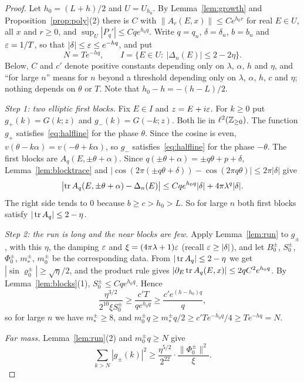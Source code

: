 \begin{proof}
Let $h_0=(L+h)/2$ and $U=U_{h_0}$. By Lemma~\ref{lem:growth} and Proposition~\ref{prop:poly}(2) there is $C$ with $\|A_r(E,x)\|\le Ce^{h_0r}$ for real $E\in U$, all $x$ and $r\ge0$, and $\sup_U|P_q'|\le Cqe^{h_0q}$. Write $q=q_n$, $\delta=\delta_n$, $b=b_n$ and $\varepsilon=1/T$, so that $|\delta|\le\varepsilon\le e^{-hq}$, and put
\[
N=Te^{-hq},\qquad I=\{E\in U:\ |\Delta_n(E)|\le2-2\eta\}.
\]
Below, $C$ and $c'$ denote positive constants depending only on $\lambda$, $\alpha$, $h$ and $\eta$, and ``for large $n$'' means for $n$ beyond a threshold depending only on $\lambda$, $\alpha$, $h$, $c$ and $\eta$; nothing depends on $\theta$ or $T$. Note that $h_0-h=-(h-L)/2$.

\emph{Step 1: two elliptic first blocks.} Fix $E\in I$ and $z=E+i\varepsilon$. For $k\ge0$ put $g_+(k)=G(k;z)$ and $g_-(k)=G(-k;z)$. Both lie in $\ell^2(\mathbb Z_{\ge0})$. The function $g_+$ satisfies~\eqref{eq:halfline} for the phase $\theta$. Since the cosine is even, $v(\theta-k\alpha)=v(-\theta+k\alpha)$, so $g_-$ satisfies~\eqref{eq:halfline} for the phase $-\theta$. The first blocks are $A_q(E,\pm\theta+\alpha)$. Since $q(\pm\theta+\alpha)=\pm q\theta+p+\delta$, Lemma~\ref{lem:blocktrace} and $|\cos(2\pi(\pm q\theta+\delta))-\cos(2\pi q\theta)|\le2\pi|\delta|$ give
\[
\bigl|\operatorname{tr} A_q(E,\pm\theta+\alpha)-\Delta_n(E)\bigr|\le Cqe^{h_0q}|\delta|+4\pi\lambda^q|\delta| .
\]
The right side tends to $0$ because $b\ge c>h_0>L$. So for large $n$ both first blocks satisfy $|\operatorname{tr} A_q|\le2-\eta$.

\emph{Step 2: the run is long and the near blocks are few.} Apply Lemma~\ref{lem:run} to $g_\pm$, with this $\eta$, the damping $\varepsilon$ and $\xi=(4\pi\lambda+1)\varepsilon$ (recall $\varepsilon\ge|\delta|$), and let $B_0^\pm$, $S_0^\pm$, $\Phi_0^\pm$, $m_*^\pm$, $m_0^\pm$ be the corresponding data. From $|\operatorname{tr} A_q|\le2-\eta$ we get $|\sin\varrho_0^\pm|\ge\sqrt\eta/2$, and the product rule gives $|\partial_E\operatorname{tr} A_q(E,x)|\le2qC^2e^{h_0q}$. By Lemma~\ref{lem:blocks}(1), $S_0^\pm\le Cqe^{h_0q}$. Hence
\[
\frac{\eta^{3/2}}{2^{10}\xi S_0^\pm}\ge\frac{c'T}{qe^{h_0q}}\ge\frac{c'e^{(h-h_0)q}}{q},
\]
so for large $n$ we have $m_*^\pm\ge8$, and $m_0^\pm q\ge m_*^\pm q/2\ge c'Te^{-h_0q}/4\ge Te^{-hq}=N$.

\emph{Far mass.} Lemma~\ref{lem:run}(2) and $m_0^\pm q\ge N$ give
\begin{equation}\label{eq:farlower}
\sum_{k>N}|g_\pm(k)|^2\ge\frac{\eta^{5/2}}{2^{22}}\cdot\frac{\|\Phi_0^\pm\|^2}{\xi}.
\end{equation}


\end{proof}
